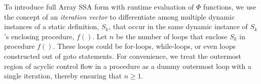 



To introduce full Array SSA form with runtime evaluation of $\Phi$
functions,
we use the concept of an  {\it iteration vector} to differentiate among multiple dynamic
instances of a static definition, $S_k$, that occur in the same
dynamic instance of $S_k$'s enclosing procedure, $f()$.
Let $n$ be the number of loops that enclose $S_k$ in procedure $f()$.
These loops could be for-loops, while-loops, or even loops constructed
out of goto statements.
For convenience, we treat the outermost
region of acyclic control flow in a procedure as a dummy outermost loop
with a single iteration, thereby ensuring that $n \geq 1$.

